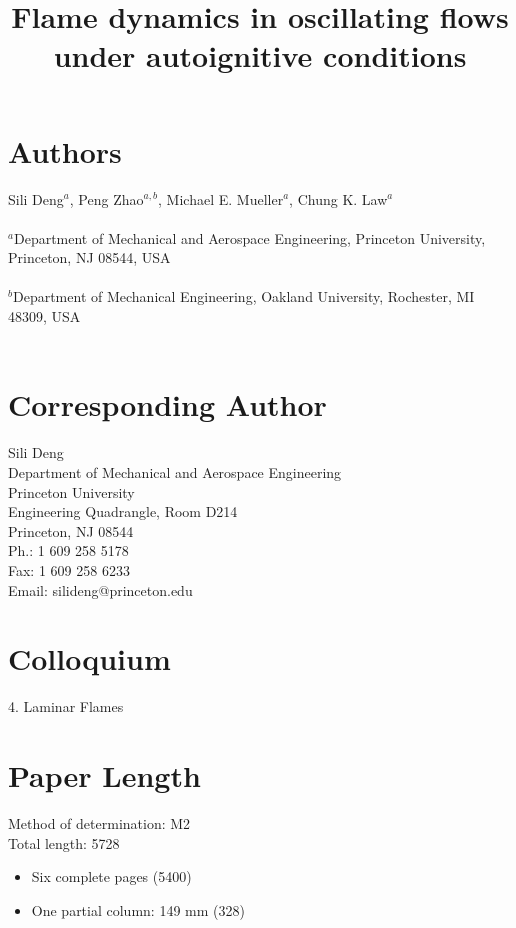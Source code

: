 \documentclass{article}
\title{Flame dynamics in oscillating flows under autoignitive conditions}
\date{}
\begin{document}
\maketitle

\section*{Authors}
Sili Deng$^a$, Peng Zhao$^{a,b}$, Michael E. Mueller$^a$, Chung K. Law$^a$\\ \\
$^a$Department of Mechanical and Aerospace Engineering, Princeton University,
Princeton, NJ 08544, USA\\ \\
$^b$Department of Mechanical Engineering, Oakland University,
Rochester, MI 48309, USA\\ \\


\section*{Corresponding Author}
Sili Deng\\
Department of Mechanical and Aerospace Engineering\\
Princeton University\\
Engineering Quadrangle, Room D214\\
Princeton, NJ 08544\\
Ph.: 1 609 258 5178\\
Fax: 1 609 258 6233\\
Email: silideng@princeton.edu

\section*{Colloquium}
4. Laminar Flames

\section*{Paper Length}
Method of determination: M2\\
Total length: 5728\\
\begin{itemize}
  \item Six complete pages (5400)
  \item One partial column: 149 mm (328)
\end{itemize}
\end{document}
